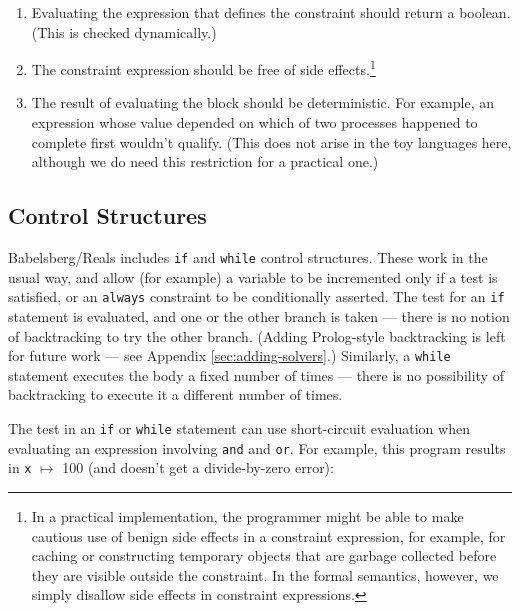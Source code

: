 \documentclass{article}
\begin{document}
\begin{enumerate}

\item \label{item:constraint-type} Evaluating the expression that
  defines the constraint should return a boolean.  (This is checked
  dynamically.) 

\item \label{item:side-effects} The constraint expression should be
  free of side
  effects.\footnote{\label{footnote:benign-side-effects}In a practical
    implementation, the programmer might be able to make cautious use of
    benign side effects in a constraint expression, for example, for
    caching or constructing temporary objects that are garbage
    collected before they are visible outside the constraint.  In the
    formal semantics, however, we simply disallow side effects in
    constraint expressions.}

\item \label{item:deterministic} The result of evaluating the block
  should be deterministic.  For example, an expression whose value
  depended on which of two processes happened to complete first
  wouldn't qualify.  (This does not arise in the toy languages here,
  although we do need this restriction for a practical one.)

\end{enumerate}

\subsection{Control Structures}

Babelsberg/Reals includes \verb|if| and \verb|while| control
structures.  These work in the usual way, and allow (for example) a
variable to be incremented only if a test is satisfied, or an
\verb|always| constraint to be conditionally asserted.  The test for
an \verb|if| statement is evaluated, and one or the other branch is
taken --- there is no notion of backtracking to try the other branch.
(Adding Prolog-style backtracking is left for future work --- see
Appendix \ref{sec:adding-solvers}.)  Similarly, a \verb|while|
statement executes the body a fixed number of times --- there is no
possibility of backtracking to execute it a different number of times.

The test in an \verb|if| or \verb|while| statement can use
short-circuit evaluation when evaluating an expression involving
\verb|and| and \verb|or|.  For example, this program  results in
\verb|x| $\mapsto$ 100 (and doesn't get a divide-by-zero error):
\end{document}
